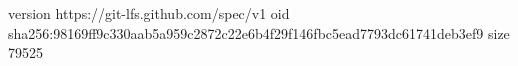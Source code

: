 version https://git-lfs.github.com/spec/v1
oid sha256:98169ff9c330aab5a959c2872c22e6b4f29f146fbc5ead7793dc61741deb3ef9
size 79525
